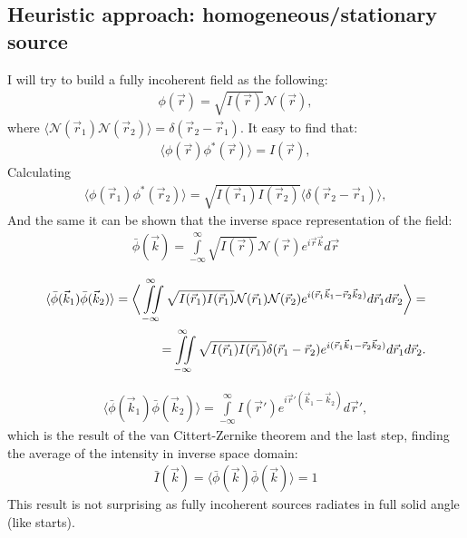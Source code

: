     \subsection{Heuristic approach: homogeneous/stationary source}
    \label{sec:Heuristic approach: homogeneous/stationary source}
        I will try to build a fully incoherent field as the following:
        \begin{align}
            \phi(\vec{r}) = \sqrt{I(\vec{r})} \mathcal{N}(\vec{r}),
        \end{align}
        where $\langle \mathcal{N}(\vec{r}_1)\mathcal{N}(\vec{r}_2)\rangle = \delta(\vec{r}_2 - \vec{r}_1)$. It easy to find that:
        \begin{align}
            \langle \phi(\vec{r})\phi^*(\vec{r}) \rangle = I(\vec{r}),
        \end{align}        
        Calculating
        \begin{align}
            \langle \phi(\vec{r}_1)\phi^*(\vec{r}_2) \rangle = \sqrt{I(\vec{r}_1)I(\vec{r}_2)} \langle \delta(\vec{r}_2 - \vec{r}_1) \rangle,
        \end{align}          
        And the same it can be shown that the inverse space representation of the field:
        \begin{align}
            \bar{\phi}(\vec{k}) = \int \limits_{-\infty}^{\infty} \sqrt{I(\vec{r})} \mathcal{N}(\vec{r}) e^{i \vec{r}\vec{k}}d\vec{r}
        \end{align}


        \begin{align}
            \langle \bar{\phi}(\vec{k}_1) \bar{\phi}(\vec{k}_2) \rangle = \bigg \langle \iint \limits_{-\infty}^{\infty}  \sqrt{I(\vec{r}_1)I(\vec{r}_1)} \mathcal{N}(\vec{r}_1)\mathcal{N}(\vec{r}_2) e^{i (\vec{r}_1\vec{k}_1 - \vec{r}_2\vec{k}_2)}d\vec{r}_1d\vec{r}_2 \bigg \rangle = \cr
            =\iint \limits_{-\infty}^{\infty} \sqrt{I(\vec{r}_1)I(\vec{r}_1)} \delta(\vec{r}_1 - \vec{r}_2) e^{i (\vec{r}_1\vec{k}_1 - \vec{r}_2\vec{k}_2)}d\vec{r}_1d\vec{r}_2.
        \end{align}

        \begin{align}
            \langle \bar{\phi}(\vec{k}_1) \bar{\phi}(\vec{k}_2) \rangle = \int \limits_{-\infty}^{\infty} I(\vec{r}') e^{i \vec{r}'(\vec{k}_1 - \vec{k}_2)}d\vec{r}', 
        \end{align}
        which is the result of the van Cittert-Zernike theorem
        and the last step, finding the average of the intensity in inverse space domain: 
        \begin{align}
            \bar{I}(\vec{k}) = \langle \bar{\phi}(\vec{k}) \bar{\phi}(\vec{k}) \rangle = 1
        \end{align}
        This result is not surprising as fully incoherent sources radiates in full solid angle (like starts).

